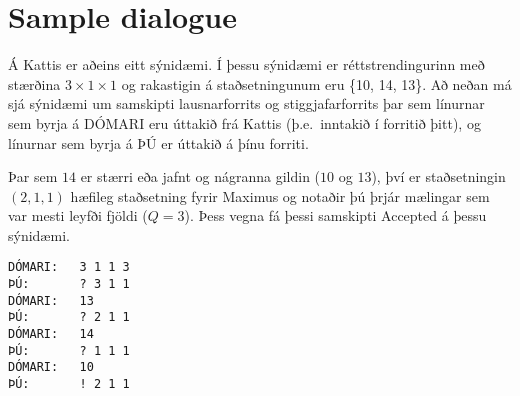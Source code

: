 \section*{Sample dialogue}
Á Kattis er aðeins eitt sýnidæmi.
Í þessu sýnidæmi er réttstrendingurinn með stærðina $3 \times 1 \times 1$ og rakastigin á staðsetningunum eru \{10, 14, 13\}.
Að neðan má sjá sýnidæmi um samskipti lausnarforrits og stiggjafarforrits þar sem línurnar sem byrja á DÓMARI eru úttakið frá Kattis (þ.e.\ inntakið í forritið þitt), og línurnar sem byrja á ÞÚ er úttakið á þínu forriti.

Þar sem $14$ er stærri eða jafnt og nágranna gildin ($10$ og $13$), því er staðsetningin $(2,1,1)$ hæfileg staðsetning fyrir Maximus og notaðir þú þrjár mælingar sem var mesti leyfði fjöldi ($Q=3$). Þess vegna fá þessi samskipti Accepted á þessu sýnidæmi.

\begin{verbatim}
DÓMARI:   3 1 1 3
ÞÚ:       ? 3 1 1
DÓMARI:   13
ÞÚ:       ? 2 1 1
DÓMARI:   14
ÞÚ:       ? 1 1 1
DÓMARI:   10
ÞÚ:       ! 2 1 1
\end{verbatim}
